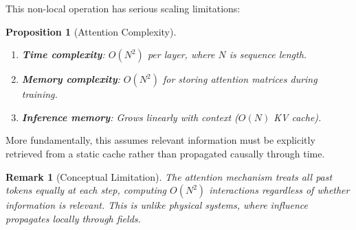 \documentclass[12pt,letterpaper,twoside]{article}
\newtheorem{remarque}{Remark}[section]
\newtheorem{prop}{Proposition}[section]
\begin{document}
This non-local operation has serious scaling limitations:

\begin{prop}[Attention Complexity]
\begin{enumerate}
\item \textbf{Time complexity}: $O(N^2)$ per layer, where $N$ is sequence length.
\item \textbf{Memory complexity}: $O(N^2)$ for storing attention matrices during training.
\item \textbf{Inference memory}: Grows linearly with context ($O(N)$ KV cache).
\end{enumerate}
\end{prop}

More fundamentally, this assumes relevant information must be explicitly retrieved from a static cache rather than propagated causally through time.

\begin{remarque}[Conceptual Limitation]
The attention mechanism treats all past tokens equally at each step, computing $O(N^2)$ interactions regardless of whether information is relevant. This is unlike physical systems, where influence propagates locally through fields.
\end{remarque}
\end{document}
